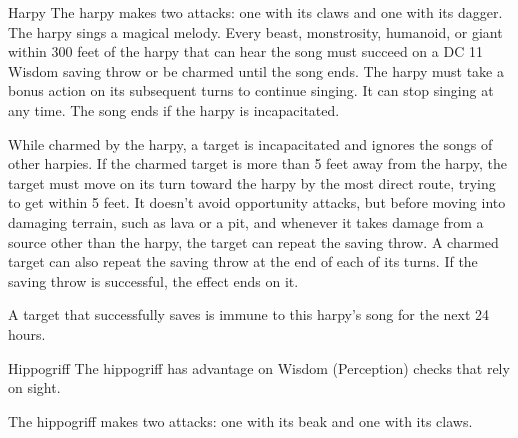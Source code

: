 \begin{DndMonster}{Harpy}
	\DndMonsterBasics[armor-class={12}, hit-points={38 (7d8 + 7)}, speed={20 ft., fly 40 ft.}]
	\DndMonsterDetails[saving-throws={}, skills={}, damage-immunities={}, damage-resistances={}, damage-vulnerabilities={}, condition-immunities={}, senses={passive Perception 10}, languages={Common}, challenge={1:1}]
	 The harpy makes two attacks: one with its claws and one with its dagger.
	\DndMonsterAttack[
		name=Claws,
		distance=melee,
		type=weapon,
		mod=+4,
		reach=5,
		dmg=\DndDice{2d4 + 2},
		dmg-type=slashing
	]
	\DndMonsterAttack[
		name=Dagger,
		distance=melee,
		type=weapon,
		mod=+4,
		reach=5,
		dmg=\DndDice{1d4 + 2},
		dmg-type=piercing
	]
	The harpy sings a magical melody. Every beast, monstrosity, humanoid, or giant within 300 feet of the harpy that can hear the song must succeed on a DC 11 Wisdom saving throw or be charmed until the song ends. The harpy must take a bonus action on its subsequent turns to continue singing. It can stop singing at any time. The song ends if the harpy is incapacitated.
	
	While charmed by the harpy, a target is incapacitated and ignores the songs of other harpies. If the charmed target is more than 5 feet away from the harpy, the target must move on its turn toward the harpy by the most direct route, trying to get within 5 feet. It doesn't avoid opportunity attacks, but before moving into damaging terrain, such as lava or a pit, and whenever it takes damage from a source other than the harpy, the target can repeat the saving throw. A charmed target can also repeat the saving throw at the end of each of its turns. If the saving throw is successful, the effect ends on it.
	
	A target that successfully saves is immune to this harpy's song for the next 24 hours.
\end{DndMonster}
		
\begin{DndMonster}{Hippogriff}
	\DndMonsterBasics[armor-class={11}, hit-points={25 (4d10 + 4)}, speed={40 ft., fly 60 ft.}]
	\DndMonsterDetails[saving-throws={}, skills={Perception +5}, damage-immunities={}, damage-resistances={}, damage-vulnerabilities={}, condition-immunities={}, senses={passive Perception 15}, languages={—}, challenge={2:1/2}]
	 The hippogriff has advantage on Wisdom (Perception) checks that rely on sight.
	
	 The hippogriff makes two attacks: one with its beak and one with its claws.
	\DndMonsterAttack[
		name=Beak,
		distance=melee,
		type=weapon,
		mod=+5,
		reach=5,
		dmg=\DndDice{1d10 + 3},
		dmg-type=piercing
	]
	\DndMonsterAttack[
		name=Claws,
		distance=melee,
		type=weapon,
		mod=+5,
		reach=5,
		dmg=\DndDice{2d6 + 3},
		dmg-type=slashing
	]
\end{DndMonster}
		
